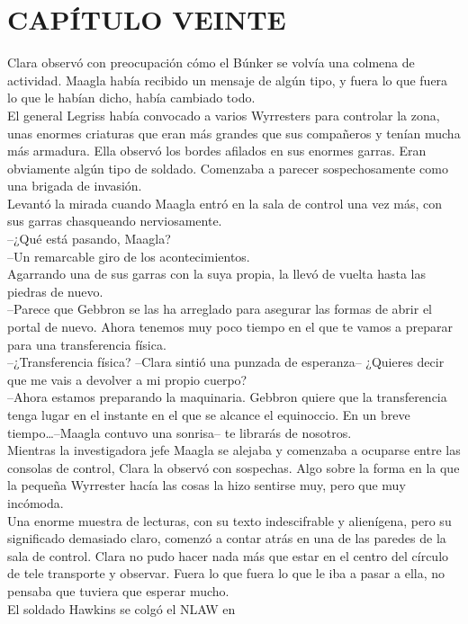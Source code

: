 \chapter*{CAPÍTULO VEINTE}
Clara observó con preocupación cómo el Búnker se volvía una colmena de
actividad. Maagla había recibido un mensaje de algún tipo, y fuera lo
que fuera lo que le habían dicho, había cambiado todo.\\
El general Legriss había convocado a varios Wyrresters para controlar la
zona, unas enormes criaturas que eran más grandes que sus compañeros y
tenían mucha más armadura. Ella observó los bordes afilados en sus
enormes garras. Eran obviamente algún tipo de soldado. Comenzaba a
parecer sospechosamente como una brigada de invasión.\\
Levantó la mirada cuando Maagla entró en la sala de control una vez más,
con sus garras chasqueando nerviosamente.\\
--¿Qué está pasando, Maagla?\\
--Un remarcable giro de los acontecimientos.\\
Agarrando una de sus garras con la suya propia, la llevó de vuelta hasta
las piedras de nuevo.\\
--Parece que Gebbron se las ha arreglado para asegurar las formas de
abrir el portal de nuevo. Ahora tenemos muy poco tiempo en el que te
vamos a preparar para una transferencia física.\\
--¿Transferencia física? --Clara sintió una punzada de esperanza--
¿Quieres decir que me vais a devolver a mi propio cuerpo?\\
--Ahora estamos preparando la maquinaria. Gebbron quiere que la
transferencia tenga lugar en el instante en el que se alcance el
equinoccio. En un breve tiempo\ldots{}--Maagla contuvo una sonrisa-- te
librarás de nosotros.\\
Mientras la investigadora jefe Maagla se alejaba y comenzaba a ocuparse
entre las consolas de control, Clara la observó con sospechas. Algo
sobre la forma en la que la pequeña Wyrrester hacía las cosas la hizo
sentirse muy, pero que muy incómoda.\\
Una enorme muestra de lecturas, con su texto indescifrable y alienígena,
pero su significado demasiado claro, comenzó a contar atrás en una de
las paredes de la sala de control. Clara no pudo hacer nada más que
estar en el centro del círculo de tele transporte y observar. Fuera lo
que fuera lo que le iba a pasar a ella, no pensaba que tuviera que
esperar mucho.\\[2\baselineskip]El soldado Hawkins se colgó el NLAW en
